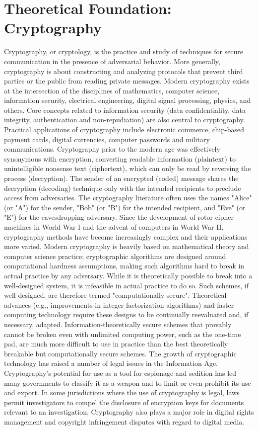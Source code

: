 \documentclass[12pt,a4paper]{report}
\begin{document}
\section{Theoretical Foundation: Cryptography}
Cryptography, or cryptology, is the practice and study of techniques for secure communication in the presence of adversarial behavior. More generally, cryptography is about constructing and analyzing protocols that prevent third parties or the public from reading private messages. Modern cryptography exists at the intersection of the disciplines of mathematics, computer science, information security, electrical engineering, digital signal processing, physics, and others. Core concepts related to information security (data confidentiality, data integrity, authentication and non-repudiation) are also central to cryptography. Practical applications of cryptography include electronic commerce, chip-based payment cards, digital currencies, computer passwords and military communications.
Cryptography prior to the modern age was effectively synonymous with encryption, converting readable information (plaintext) to unintelligible nonsense text (ciphertext), which can only be read by reversing the process (decryption). The sender of an encrypted (coded) message shares the decryption (decoding) technique only with the intended recipients to preclude access from adversaries. The cryptography literature often uses the names "Alice" (or "A") for the sender, "Bob" (or "B") for the intended recipient, and "Eve" (or "E") for the eavesdropping adversary. Since the development of rotor cipher machines in World War I and the advent of computers in World War II, cryptography methods have become increasingly complex and their applications more varied.
Modern cryptography is heavily based on mathematical theory and computer science practice; cryptographic algorithms are designed around computational hardness assumptions, making such algorithms hard to break in actual practice by any adversary. While it is theoretically possible to break into a well-designed system, it is infeasible in actual practice to do so. Such schemes, if well designed, are therefore termed "computationally secure". Theoretical advances (e.g., improvements in integer factorization algorithms) and faster computing technology require these designs to be continually reevaluated and, if necessary, adapted. Information-theoretically secure schemes that provably cannot be broken even with unlimited computing power, such as the one-time pad, are much more difficult to use in practice than the best theoretically breakable but computationally secure schemes.
The growth of cryptographic technology has raised a number of legal issues in the Information Age. Cryptography's potential for use as a tool for espionage and sedition has led many governments to classify it as a weapon and to limit or even prohibit its use and export. In some jurisdictions where the use of cryptography is legal, laws permit investigators to compel the disclosure of encryption keys for documents relevant to an investigation. Cryptography also plays a major role in digital rights management and copyright infringement disputes with regard to digital media.
\end{document}
